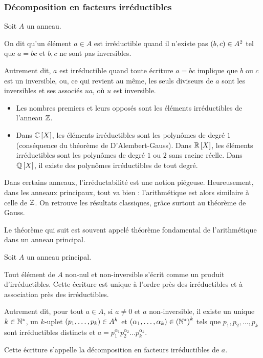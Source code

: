 \subsubsection{Décomposition en facteurs irréductibles}

\begin{defi}
Soit \(A\) un anneau.

On dit qu'un élément \(a\in A\) est irréductible quand il n'existe pas \(\left(b,c\right)\in A^2\) tel que \(a=bc\) et \(b,c\) ne sont pas inversibles.
\end{defi}

Autrement dit, \(a\) est irréductible quand toute écriture \(a=bc\) implique que \(b\) ou \(c\) est un inversible, ou, ce qui revient au même, les seuls diviseurs de \(a\) sont les inversibles et ses associés \(ua\), où \(u\) est inversible.

\begin{ex}
\begin{itemize}
    \item Les nombres premiers et leurs opposés sont les éléments irréductibles de l'anneau \(\mathbb{Z}\). \\
    \item Dans \(\poly[\C]\), les éléments irréductibles sont les polynômes de degré \(1\) (conséquence du théorème de D'Alembert-Gauss). Dans \(\poly[\R]\), les éléments irréductibles sont les polynômes de degré \(1\) ou \(2\) sans racine réelle. Dans \(\poly[\Q]\), il existe des polynômes irréductibles de tout degré.
\end{itemize}
\end{ex}

Dans certains anneaux, l'irréductabilité est une notion piégeuse. Heureusement, dans les anneaux principaux, tout va bien : l'arithmétique est alors similaire à celle de \(\mathbb{Z}\). On retrouve les résultats classiques, grâce surtout au théorème de Gauss.

Le théorème qui suit est souvent appelé théorème fondamental de l'arithmétique dans un anneau principal.

\begin{theo}
Soit \(A\) un anneau principal.

Tout élément de \(A\) non-nul et non-inversible s'écrit comme un produit d'irréductibles. Cette écriture est unique à l'ordre près des irréductibles et à association près des irréductibles.

Autrement dit, pour tout \(a\in A\), si \(a\not=0\) et \(a\) non-inversible, il existe un unique \(k\in\mathbb{N}^*\), un \(k\)-uplet \(\left(p_1,\dots,p_k\right)\in A^k\) et \(\left(\alpha_1,\dots,\alpha_k\right)\in\left(\mathbb{N}^*\right)^k\) tels que \(p_1,p_2,\dots,p_k\) sont irréductibles distincts et \(a=p_1^{\alpha_1}p_2^{\alpha_2}\dots p_k^{\alpha_k}\).

Cette écriture s'appelle la décomposition en facteurs irréductibles de \(a\).
\end{theo}

